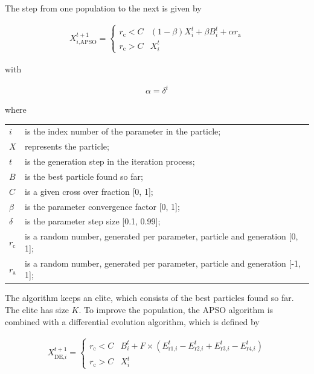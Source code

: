 The step from one population to the next is given by

\begin{align}\label{eq:APSO}
X_{i\text{,APSO}}^{t+1} = \left\{\begin{array}{ll}r_{\text{c}} < C & \left(1 - \beta\right)X_{i}^{t} + \beta B_{i}^{t} + \alpha r_{\text{a}} \\
r_{\text{c}} > C & X_{i}^{t}
\end{array}	
\right.
\end{align}

with

\begin{align}
\alpha = \delta ^ t
\end{align}

where

\begin{longtable*}{p{18mm}p{\textwidth-24pt-18mm}}  
	$i$ & is the index number of the parameter in the particle; \\  
	$X$ & represents the particle; \\  
	$t$ & is the generation step in the iteration process;\\
	$B$ & is the best particle found so far;\\  
	$C$ & is a given cross over fraction [0, 1];\\  
	$\beta$ & is the parameter convergence factor [0, 1]; \\  
	$\delta$ & is the parameter step size [0.1, 0.99]; \\  
	$r_{\text{c}}$ & is a random number, generated per parameter, particle and generation [0, 1]; \\
	$r_{\text{a}}$ & is a random number, generated per parameter, particle and generation [-1, 1]; 
\end{longtable*}

The algorithm keeps an elite, which consists of the best particles found so far.
The elite has size $K$.
To improve the population,
the APSO algorithm is combined with a differential evolution algorithm, which is defined by

\begin{align}\label{eq:DE}
X_{\text{DE,} i}^{t+1} = \left\{\begin{array}{ll}r_{\text{c}} < C & B_{i}^{t} + F \times \left(E_{\text{r1,} i}^{t} - E_{\text{r2,} i}^{t} + E_{\text{r3,} i}^{t} - E_{\text{r4,} i}^{t}\right)\\
r_{\text{c}} > C & X_{i}^{t}
\end{array}	
\right.
\end{align}

